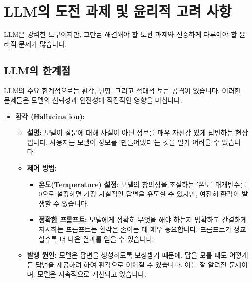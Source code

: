 \documentclass[11pt,a4paper]{article}
\theoremstyle{definition}
\begin{document}
\newpage
\section{LLM의 도전 과제 및 윤리적 고려 사항}

LLM은 강력한 도구이지만, 그만큼 해결해야 할 도전 과제와 신중하게 다루어야 할 윤리적 문제가 많습니다.

\subsection{LLM의 한계점}

LLM의 주요 한계점으로는 환각, 편향, 그리고 적대적 토큰 공격이 있습니다. 이러한 문제들은 모델의 신뢰성과 안전성에 직접적인 영향을 미칩니다.

\begin{itemize}
    \item \textbf{환각 (Hallucination):}
    \begin{itemize}
        \item \textbf{설명:} 모델이 질문에 대해 사실이 아닌 정보를 매우 자신감 있게 답변하는 현상입니다. 사용자는 모델이 정보를 '만들어냈다'는 것을 알기 어려울 수 있습니다.
        \item \textbf{제어 방법:}
        \begin{itemize}
            \item \textbf{온도(Temperature) 설정:} 모델의 창의성을 조절하는 '온도' 매개변수를 0으로 설정하면 가장 사실적인 답변을 유도할 수 있지만, 여전히 환각이 발생할 수 있습니다.
            \item \textbf{정확한 프롬프트:} 모델에게 정확히 무엇을 해야 하는지 명확하고 간결하게 지시하는 프롬프트는 환각을 줄이는 데 매우 중요합니다. 프롬프트가 정교할수록 더 나은 결과를 얻을 수 있습니다.
        \end{itemize}
        \item \textbf{발생 원인:} 모델은 답변을 생성하도록 보상받기 때문에, 답을 모를 때도 어떻게든 답변을 제공하려 하여 환각으로 이어질 수 있습니다. 이는 잘 알려진 문제이며, 모델은 지속적으로 개선되고 있습니다.
    \end{itemize}


\end{itemize}
\end{document}

